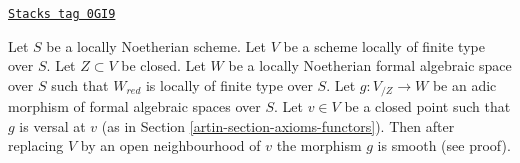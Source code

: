\begin{lemma}
\label{artin-lemma-openness-smoothness}
\href{https://stacks.math.columbia.edu/tag/0GI9}{\texttt{Stacks tag 0GI9}}

Let $S$ be a locally Noetherian scheme. Let $V$ be a scheme locally
of finite type over $S$. Let $Z \subset V$ be closed. Let $W$ be
a locally Noetherian formal algebraic space over $S$ such that
$W_{red}$ is locally of finite type over $S$. Let $g : V_{/Z} \to W$
be an adic morphism of formal algebraic spaces over $S$. Let $v \in V$
be a closed point such that $g$ is versal at $v$ (as in
Section \ref{artin-section-axioms-functors}).
Then after replacing $V$ by an open neighbourhood of $v$ the
morphism $g$ is smooth (see proof).
\end{lemma}

